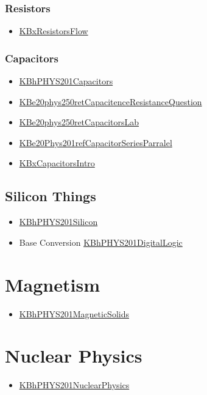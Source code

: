 \documentclass[letterpaper]{article}
\begin{document}
\subsubsection{Resistors}
\label{sec:orgb6b2382}
\begin{itemize}
\item \href{KBxResistorsFlow.org}{KBxResistorsFlow}
\end{itemize}

\subsubsection{Capacitors}
\label{sec:orga8df316}
\begin{itemize}
\item \href{KBhPHYS201Capacitors.org}{KBhPHYS201Capacitors}
\item \href{KBe20phys250retCapacitenceResistanceQuestion.org}{KBe20phys250retCapacitenceResistanceQuestion}
\item \href{KBe20phys250retCapacitorsLab.org}{KBe20phys250retCapacitorsLab}
\item \href{KBe20Phys201refCapacitorSeriesParralel.org}{KBe20Phys201refCapacitorSeriesParralel}
\item \href{KBxCapacitorsIntro.org}{KBxCapacitorsIntro}
\end{itemize}

\subsection{Silicon Things}
\label{sec:org5da7b80}
\begin{itemize}
\item \href{KBhPHYS201Silicon.org}{KBhPHYS201Silicon}
\item Base Conversion
\href{KBhPHYS201DigitalLogic.org}{KBhPHYS201DigitalLogic}
\end{itemize}

\section{Magnetism}
\label{sec:orgd83fc43}
\begin{itemize}
\item \href{KBhPHYS201MagneticSolids.org}{KBhPHYS201MagneticSolids}
\end{itemize}

\section{Nuclear Physics}
\label{sec:org2814f6f}
\begin{itemize}
\item \href{KBhPHYS201NuclearPhysics.org}{KBhPHYS201NuclearPhysics}
\end{itemize}
\end{document}
